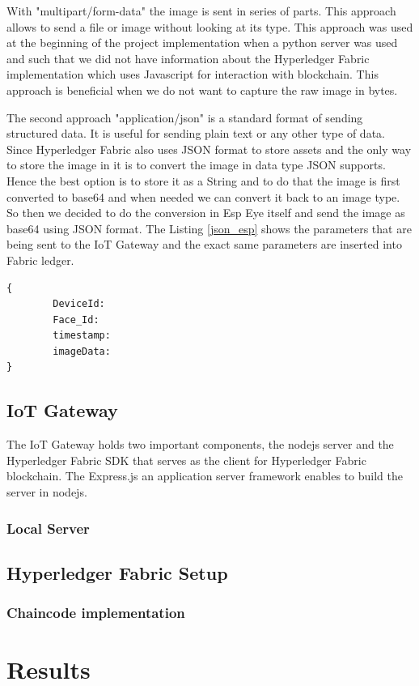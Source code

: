 With "multipart/form-data" the image is sent in series of parts. This approach allows to send a file or image without looking at its type. This approach was used at the beginning of the project implementation when a python server was used and such that we did not have information about the Hyperledger Fabric implementation which uses Javascript for interaction with blockchain. This approach is beneficial when we do not want to capture the raw image in bytes. 

The second approach "application/json" is a standard format of sending structured data. It is useful for sending plain text or any other type of data. Since Hyperledger Fabric also uses JSON format to store assets and the only way to store the image in it is to convert the image in data type JSON supports. Hence the best option is to store it as a String and to do that the image is first converted to {\selectfont base64} and when needed we can convert it back to an image type. So then we decided to do the conversion in Esp Eye itself and send the image as {\selectfont base64} using JSON format. 
The Listing \ref{json_esp} shows the parameters that are being sent to the IoT Gateway and the exact same parameters are inserted into Fabric ledger.
\begin{lstlisting}[caption={JSON data in Esp Eye},label=json_esp, captionpos=b]
{
        DeviceId: 
        Face_Id: 
        timestamp: 
        imageData: 
}

\end{lstlisting}
\subsection{IoT Gateway}

The IoT Gateway holds two important components, the nodejs server and the Hyperledger Fabric SDK that serves as the client for Hyperledger Fabric blockchain. The Express.js an application server framework enables to build the server in nodejs. 
\subsubsection{Local Server}

\subsection{Hyperledger Fabric Setup}
\subsubsection{Chaincode implementation}





\section{Results}





